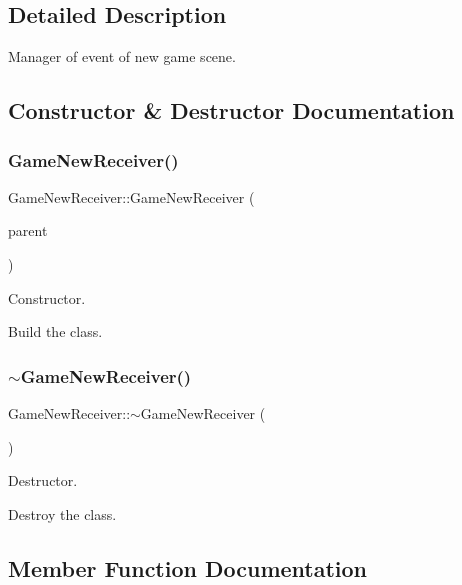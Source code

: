 \subsection{Detailed Description}
Manager of event of new game scene. 

\subsection{Constructor \& Destructor Documentation}
\mbox{\label{classGameNewReceiver_a41816905e385ac8e17849d599106b930}} 
\subsubsection{\texorpdfstring{Game\+New\+Receiver()}{GameNewReceiver()}}
{\footnotesize\ttfamily Game\+New\+Receiver\+::\+Game\+New\+Receiver (\begin{DoxyParamCaption}\item[{const \hyperlink{classGameNewScene}{Game\+New\+Scene} $\ast$}]{parent }\end{DoxyParamCaption})}



Constructor. 

Build the class. \mbox{\label{classGameNewReceiver_ab92b6653b56d291853a4e2f737eaf6fd}} 
\subsubsection{\texorpdfstring{$\sim$\+Game\+New\+Receiver()}{~GameNewReceiver()}}
{\footnotesize\ttfamily Game\+New\+Receiver\+::$\sim$\+Game\+New\+Receiver (\begin{DoxyParamCaption}{ }\end{DoxyParamCaption})}



Destructor. 

Destroy the class. 

\subsection{Member Function Documentation}
\mbox{\label{classGameNewReceiver_ad9ec097d8b46946ed1a21c24463fc0b6}} 

